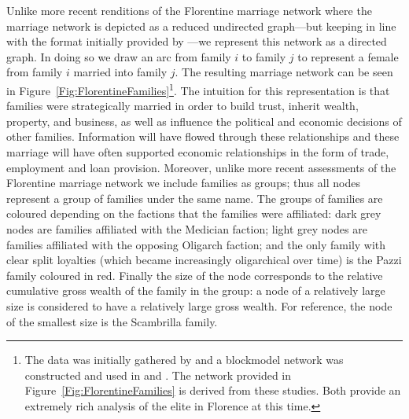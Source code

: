 Unlike more recent renditions of the Florentine marriage network where the marriage network is depicted as a reduced undirected graph---but keeping in line with the format initially provided by \citet[p.~1276--1277]{Padgett1993}---we represent this network as a directed graph. In doing so we draw an arc from family $i$ to family $j$ to represent a female from family $i$ married into family $j$. The resulting marriage network can be seen in Figure~\ref{Fig:FlorentineFamilies}\footnote{The data was initially gathered by \citet{Kent1978} and a blockmodel network was constructed and used in \citet{Padgett1993} and \citet{Padgett1994}. The network provided in Figure~\ref{Fig:FlorentineFamilies} is derived from these studies. Both provide an extremely rich analysis of the elite in Florence at this time.}. The intuition for this representation is that families were strategically married in order to build trust, inherit wealth, property, and business, as well as influence the political and economic decisions of other families. Information will have flowed through these relationships and these marriage will have often supported economic relationships in the form of trade, employment and loan provision. Moreover, unlike more recent assessments of the Florentine marriage network we include families as groups; thus all nodes represent a group of families under the same name. The groups of families are coloured depending on the factions that the families were affiliated: dark grey nodes are families affiliated with the Medician faction; light grey nodes are families affiliated with the opposing Oligarch faction; and the only family with clear split loyalties (which became increasingly oligarchical over time) is the Pazzi family coloured in red. Finally the size of the node corresponds to the relative cumulative gross wealth of the family in the group: a node of a relatively large size is considered to have a relatively large gross wealth. For reference, the node of the smallest size is the Scambrilla family.

